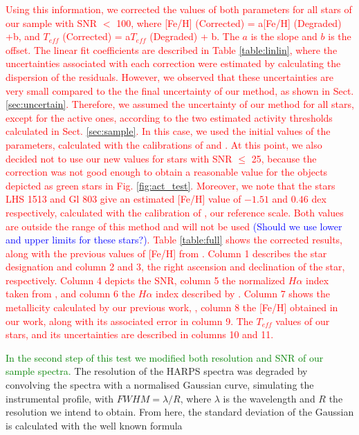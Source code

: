 \documentclass{aa}
\begin{document}
\textcolor{red}{Using this information, we corrected the values of both parameters for all stars of our sample with SNR $<$ 100, where [Fe/H] (Corrected) = a[Fe/H] (Degraded) +b, and $T_{eff}$ (Corrected) = a$T_{eff}$ (Degraded) + b. The $a$ is the slope and $b$ is the offset. The linear fit coefficients are described in Table \ref{table:linlin}, where the uncertainties associated with each correction were  estimated by calculating the dispersion of the residuals. However, we observed that these uncertainties are very small compared to the the final uncertainty of our method, as shown in Sect. \ref{sec:uncertain}. Therefore, we assumed the uncertainty of our method for all stars, except for the active ones, according to the two estimated activity thresholds calculated in Sect. \ref{sec:sample}. In this case, we used the initial values of the parameters, calculated with the calibrations of \citet{Neves-2012} and \citet{Casagrande-2008}. At this point, we also decided not to use our new values for stars with SNR $\leq$ 25, because the correction was not good enough to obtain a reasonable value for the objects depicted as green stars in Fig. \ref{fig:act_test}. Moreover, we note that the stars LHS 1513 and Gl 803 give an estimated [Fe/H] value of $-1.51$ and $0.46$ dex respectively, calculated with the calibration of \citet{Neves-2012}, our reference scale. Both values are outside the range of this method and will not be used \textcolor{blue}{(Should we use lower and upper limits for these stars?)}. Table \ref{table:full} shows the corrected results, along with the previous values of [Fe/H] from \citet{Neves-2013}. Column 1 describes the star designation and column 2 and 3, the right ascension and declination of the star, respectively. Column 4 depicts the SNR, column 5 the normalized $H\alpha$ index taken from \citet{Reiners-2012}, and column 6 the $H\alpha$ index described by \citet{Gomes_da_Silva-2011}. Column 7 shows the metallicity calculated by our previous work, \citet{Neves-2013}, column 8 the [Fe/H] obtained in our work, along with its associated error in column 9. The $T_{eff}$ values of our stars, and its uncertainties are described in columns 10 and 11.}    %

\addtocounter{table}{1}


\textcolor{green}{In the second step of this test we modified both resolution and SNR of our sample spectra.} The resolution of the HARPS spectra was degraded by convolving the spectra with a normalised Gaussian curve, simulating the instrumental profile, with $FWHM = \lambda/R$, where $\lambda$ is the wavelength and $R$ the resolution we intend to obtain. %
From here, the standard deviation of the Gaussian is calculated with the well known formula 
\end{document}
